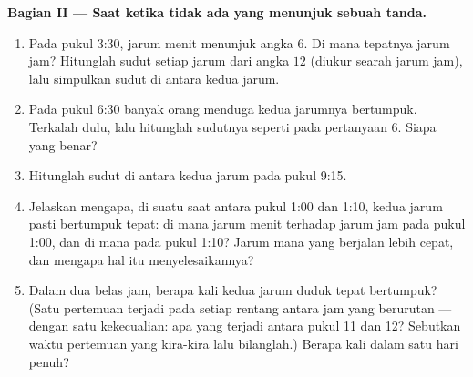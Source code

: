 \begin{problem}
\medskip
\noindent\textbf{Bagian II --- Saat ketika tidak ada yang menunjuk
sebuah tanda.}
\begin{enumerate}[resume]
  \item Pada pukul 3:30, jarum menit menunjuk angka $6$. Di mana
        tepatnya jarum jam? Hitunglah sudut setiap jarum dari angka
        $12$ (diukur searah jarum jam), lalu simpulkan sudut di antara
        kedua jarum.
  \item Pada pukul 6:30 banyak orang menduga kedua jarumnya bertumpuk.
        Terkalah dulu, lalu hitunglah sudutnya seperti pada pertanyaan
        6. Siapa yang benar?
  \item Hitunglah sudut di antara kedua jarum pada pukul 9:15.
  \item Jelaskan mengapa, di suatu saat antara pukul 1:00 dan 1:10,
        kedua jarum pasti bertumpuk tepat: di mana jarum menit
        terhadap jarum jam pada pukul 1:00, dan di mana pada pukul
        1:10? Jarum mana yang berjalan lebih cepat, dan mengapa hal
        itu menyelesaikannya?
  \item Dalam dua belas jam, berapa kali kedua jarum duduk tepat
        bertumpuk? (Satu pertemuan terjadi pada setiap rentang antara
        jam yang berurutan --- dengan satu kekecualian: apa yang
        terjadi antara pukul 11 dan 12? Sebutkan waktu pertemuan yang
        kira-kira lalu bilanglah.) Berapa kali dalam satu hari penuh?
\end{enumerate}


\end{problem}
